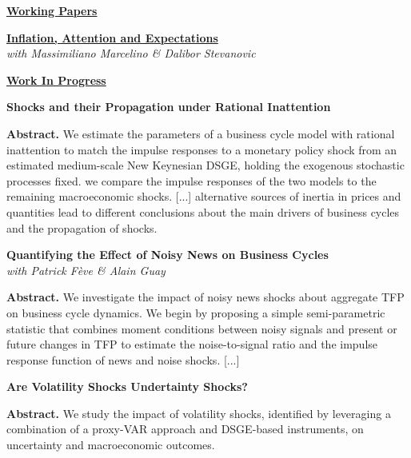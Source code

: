\documentclass{article}
\begin{document}
	\noindent\underline{\textbf{Working Papers}}
	\vspace{6pt}
	
	\noindent\href{https://etiennebriand.github.io/BMS_AttentionInflationExpectations.pdf}{\textbf{Inflation, Attention and Expectations}}
	\\ \textit{with Massimiliano Marcelino \& Dalibor Stevanovic}
	\vspace{6pt}
  
	\noindent\underline{\textbf{Work In Progress}}
	\vspace{6pt}
		
	\noindent \textbf{Shocks and their Propagation under Rational Inattention} 
	\vspace{4pt} 
	
	\noindent \textbf{Abstract.} We estimate the parameters of a business cycle model with rational inattention to match the impulse responses to a monetary policy shock from an estimated medium-scale New Keynesian DSGE, holding the exogenous stochastic processes fixed. we compare the impulse responses of the two models to the remaining macroeconomic shocks. [...] alternative sources of inertia in prices and quantities lead to different conclusions about the main drivers of business cycles and the propagation of shocks.
	\vspace{4pt}
	
	\noindent \textbf{Quantifying the Effect of Noisy News on Business Cycles}\\
	\textit{with Patrick Fève \& Alain Guay}
	\vspace{4pt}
	
	\noindent \textbf{Abstract.}  We investigate the impact of noisy news shocks about aggregate TFP on business cycle dynamics. We begin by proposing a simple semi-parametric statistic that combines moment conditions between noisy signals and present or future changes in TFP to estimate the noise-to-signal ratio and the impulse response function of news and noise shocks. [...]
	\vspace{4pt}
	
	\noindent \textbf{Are Volatility Shocks Undertainty Shocks?}
	\vspace{4pt}
	
	\noindent \textbf{Abstract.} We study the impact of volatility shocks, identified by leveraging a combination of a proxy-VAR approach and DSGE-based instruments, on uncertainty and macroeconomic outcomes. 
   \vspace{6pt}
	
\end{document}
